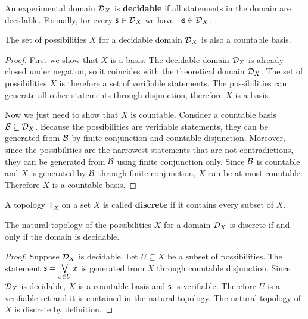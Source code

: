\documentclass[11pt,letterpaper,fleqn]{memoir} %
\begin{document}
\begin{mathSection}
	
	\begin{defn}
		An experimental domain $\mathcal{D}_X$ is \textbf{decidable} if all statements in the domain are decidable. Formally, for every $\mathsf{s} \in \mathcal{D}_X$ we have $\neg\mathsf{s} \in \mathcal{D}_X$.
	\end{defn}
	
	\begin{prop}
		The set of possibilities $X$ for a decidable domain $\mathcal{D}_X$ is also a countable basis.
	\end{prop}
	
	\begin{proof}
		First we show that $X$ is a basis. The decidable domain $\mathcal{D}_X$ is already closed under negation, so it coincides with the theoretical domain $\bar{\mathcal{D}}_X$. The set of possibilities $X$ is therefore a set of verifiable statements. The possibilities can generate all other statements through disjunction, therefore $X$ is a basis.
		
		Now we just need to show that $X$ is countable. Consider a countable basis $\mathcal{B} \subseteq \mathcal{D}_X$. Because the possibilities are verifiable statements, they can be generated from $\mathcal{B}$ by finite conjunction and countable disjunction. Moreover, since the possibilities are the narrowest statements that are not contradictions, they can be generated from $\mathcal{B}$ using finite conjunction only. Since $\mathcal{B}$ is countable and $X$ is generated by $\mathcal{B}$ through finite conjunction, $X$ can be at most countable. Therefore $X$ is a countable basis.
	\end{proof}
	
	\begin{defn}
		A topology $\mathsf{T}_X$ on a set $X$ is called \textbf{discrete} if it contains every subset of $X$.
	\end{defn}
	
	\begin{thrm}\label{thrm_decidablity_is_discreteness}
		The natural topology of the possibilities $X$ for a domain $\mathcal{D}_X$ is discrete if and only if the domain is decidable.
	\end{thrm}
	\begin{proof}
		Suppose $\mathcal{D}_X$ is decidable. Let $U \subseteq X$ be a subset of possibilities. The statement $\mathsf{s} = \bigvee\limits_{x \in U} x$ is generated from $X$ through countable disjunction. Since $\mathcal{D}_X$ is decidable, $X$ is a countable basis and $\mathsf{s}$ is verifiable. Therefore $U$ is a verifiable set and it is contained in the natural topology. The natural topology of $X$ is discrete by definition.
		

\end{proof}
\end{mathSection}
\end{document}
